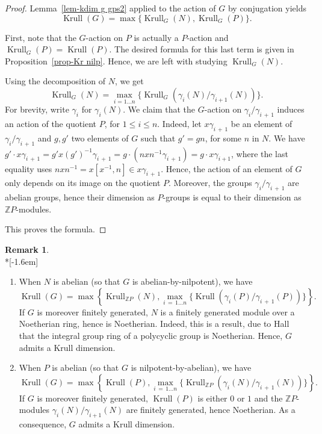 \documentclass[11pt]{article}
\theoremstyle{definition}
\newtheorem{rema}[theo]{Remark}
\numberwithin{equation}{section}
\numberwithin{figure}{section}
\numberwithin{table}{section}
\newcommand{\Z}{\mathbb{Z}}
\DeclareMathOperator{\krull}{Krull}
\newcommand*{\romanenumi}{\renewcommand*{\theenumi}{\roman{enumi}}}
\begin{document}
\begin{proof}
Lemma~\ref{lem-kdim g gps2} applied to the action of $G$ by conjugation yields
\[
\krull(G) = \max\{ \krull_G(N), \krull_G(P)\}.
\]

First, note that the $G$-action on $P$ is actually a $P$-action and $\krull_G(P) = \krull(P)$. The desired formula for this last term is given in Proposition~\ref{prop-Kr nilp}. Hence, we are left with studying $\krull_G(N)$.

Using the decomposition of $N$, we get
\[
\krull_G(N) = \max\limits_{i = 1 \dots n}\big\{ \krull_G(\gamma_i(N)/\gamma_{i+1}(N)) \big\}.
\]
For brevity, write $\gamma_i$ for $\gamma_i(N)$. We claim that the $G$-action on $\gamma_i/\gamma_{i\,+\,1}$ induces an action of the quotient $P$, for $1 \leq i \leq n$. Indeed, let $x\gamma_{i\,+\,1}$ be an element of $\gamma_i/\gamma_{i\,+\,1}$ and $g, g'$ two elements of $G$ such that $g' = gn$, for some $n$ in $N$. We have $g'\cdot x\gamma_{i\,+\,1} = g'x(g')^{-1} \gamma_{i\,+\,1} = g\cdot (nxn^{-1}\gamma_{i\,+\,1}) = g\cdot x\gamma_{i+1}$, where the last equality uses $nxn^{-1} = x[x^{-1}, n] \in x\gamma_{i\,+\,1}$. Hence, the action of an element of $G$ only depends on its image on the quotient $P$. Moreover, the groups $\gamma_i/\gamma_{i\,+\,1}$ are abelian groups, hence their dimension as $P$-groups is equal to their dimension as $\Z P$-modules.

This proves the formula.
\end{proof}

\begin{rema}\label{rem-kd apn npa}\ \\*[-1.6em]
\begin{enumerate}\romanenumi
\item \label{list2.12.1}When $N$ is abelian (so that $G$ is abelian-by-nilpotent), we have
\begin{equation*}
\krull(G) = \max\left\{\krull_{\Z P}(N), \max\limits_{i\,=\,1\dots n} \big\{\krull(\gamma_i(P)/\gamma_{i\,+\,1}(P))\big\}\right\}.
\end{equation*}
If $G$ is moreover finitely generated, $N$ is a finitely generated module over a Noetherian ring, hence is Noetherian. Indeed, this is a result, due to Hall~\cite{Hall54} that the integral group ring of a polycyclic group is Noetherian. Hence, $G$ admits a Krull dimension.
\item \label{list2.12.2}When $P$ is abelian (so that $G$ is nilpotent-by-abelian), we have
\begin{equation*}
\krull(G) = \max \left\{\krull(P), \max\limits_{i\,=\,1 \dots n} \big\{ \krull_{\Z P}(\gamma_i(N)/\gamma_{i\,+\,1}(N)) \big\}\right\}.
\end{equation*}
If $G$ is moreover finitely generated, $\krull(P)$ is either $0$ or $1$ and the $\Z P$-modules $\gamma_i(N)/\gamma_{i +1}(N)$ are finitely generated, hence Noetherian. As a consequence, $G$ admits a Krull dimension.
\end{enumerate}
\end{rema}
\end{document}
